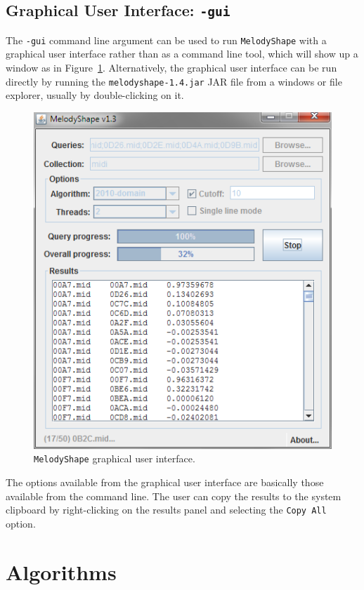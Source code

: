 \documentclass[twoside]{article}
\begin{document}
\subsection{Graphical User Interface: \texttt{-gui}}\label{ssec:gui}

The \texttt{-gui} command line argument can be used to run \texttt{MelodyShape} with a graphical user interface rather than as a command line tool, which will show up a window as in Figure~\ref{fig:gui}. Alternatively, the graphical user interface can be run directly by running the \texttt{melodyshape-1.4.jar} JAR file from a windows or file explorer, usually by double-clicking on it.
\begin{figure}[!h]
\centering\includegraphics[scale=.6]{gui.png}
\caption{\texttt{MelodyShape} graphical user interface.}
\label{fig:gui}
\end{figure}

The options available from the graphical user interface are basically those available from the command line. The user can copy the results to the system clipboard by right-clicking on the results panel and selecting the \texttt{Copy All} option.

\section{Algorithms}
\end{document}
